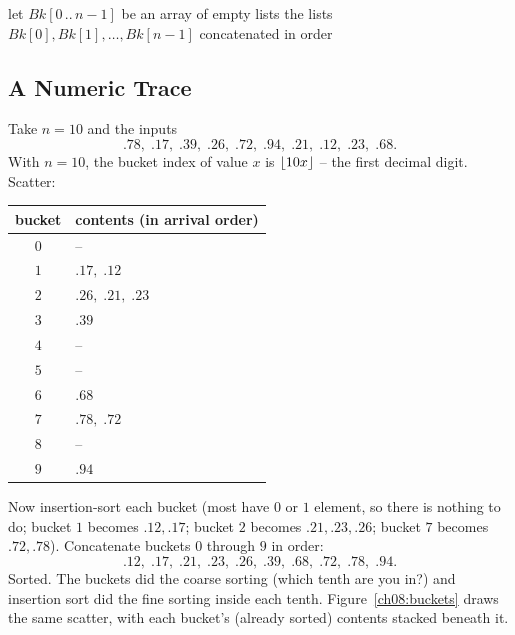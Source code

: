 \begin{algorithm}[H]
\caption{\textsc{Bucket-Sort}}
\KwIn{Array $A[1\,..\,n]$ with each $A[j] \in [0,1)$.}
let $\mathit{Bk}[0\,..\,n-1]$ be an array of empty lists\;
\Return the lists $\mathit{Bk}[0], \mathit{Bk}[1], \dots,
\mathit{Bk}[n-1]$ concatenated in order\;
\end{algorithm}

\subsection{A Numeric Trace}

Take $n = 10$ and the inputs
\[
.78,\;.17,\;.39,\;.26,\;.72,\;.94,\;.21,\;.12,\;.23,\;.68.
\]
With $n = 10$, the bucket index of value $x$ is $\lfloor10x\rfloor$ -- the first
decimal digit. Scatter:

\begin{center}
\begin{tabular}{c|l}
bucket & contents (in arrival order)\\\hline
$0$ & --\\
$1$ & $.17,\; .12$\\
$2$ & $.26,\; .21,\; .23$\\
$3$ & $.39$\\
$4$ & --\\
$5$ & --\\
$6$ & $.68$\\
$7$ & $.78,\; .72$\\
$8$ & --\\
$9$ & $.94$\\
\end{tabular}
\end{center}

Now insertion-sort each bucket (most have $0$ or $1$ element, so there is
nothing to do; bucket $1$ becomes $.12, .17$; bucket $2$ becomes
$.21, .23, .26$; bucket $7$ becomes $.72, .78$). Concatenate buckets $0$ through
$9$ in order:
\[
.12,\;.17,\;.21,\;.23,\;.26,\;.39,\;.68,\;.72,\;.78,\;.94.
\]
Sorted. The buckets did the coarse sorting (which tenth are you in?) and
insertion sort did the fine sorting inside each tenth.
Figure~\ref{ch08:buckets} draws the same scatter, with each bucket's
(already sorted) contents stacked beneath it.

